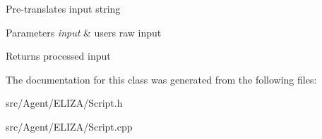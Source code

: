 Pre-\/translates input string 
\begin{DoxyParams}{Parameters}
{\em input} & user\textquotesingle{}s raw input \\
\hline
\end{DoxyParams}
\begin{DoxyReturn}{Returns}
processed input 
\end{DoxyReturn}


The documentation for this class was generated from the following files\+:\begin{DoxyCompactItemize}
\item 
src/\+Agent/\+E\+L\+I\+Z\+A/Script.\+h\item 
src/\+Agent/\+E\+L\+I\+Z\+A/Script.\+cpp\end{DoxyCompactItemize}
